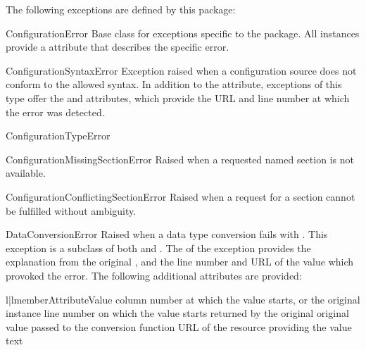 \documentclass{howto}
\begin{document}
The following exceptions are defined by this package:

\begin{excdesc}{ConfigurationError}
  Base class for exceptions specific to the  package.
  All instances provide a  attribute that describes
  the specific error.
\end{excdesc}

\begin{excdesc}{ConfigurationSyntaxError}
  Exception raised when a configuration source does not conform to the
  allowed syntax.  In addition to the  attribute,
  exceptions of this type offer the  and 
  attributes, which provide the URL and line number at which the error
  was detected.
\end{excdesc}

\begin{excdesc}{ConfigurationTypeError}
\end{excdesc}

\begin{excdesc}{ConfigurationMissingSectionError}
  Raised when a requested named section is not available.
\end{excdesc}

\begin{excdesc}{ConfigurationConflictingSectionError}
  Raised when a request for a section cannot be fulfilled without
  ambiguity.
\end{excdesc}

\begin{excdesc}{DataConversionError}
  Raised when a data type conversion fails with
  .  This exception is a subclass of both
   and .  The
   of the exception provides the explanation from the
  original , and the line number and URL of the
  value which provoked the error.  The following additional attributes
  are provided:

  \begin{tableii}{l|l}{member}{Attribute}{Value}
           {column number at which the value starts, or }
           {the original  instance}
           {line number on which the value starts}
           { returned by the original }
           {original value passed to the conversion function}
           {URL of the resource providing the value text}
  \end{tableii}
\end{excdesc}
\end{document}
